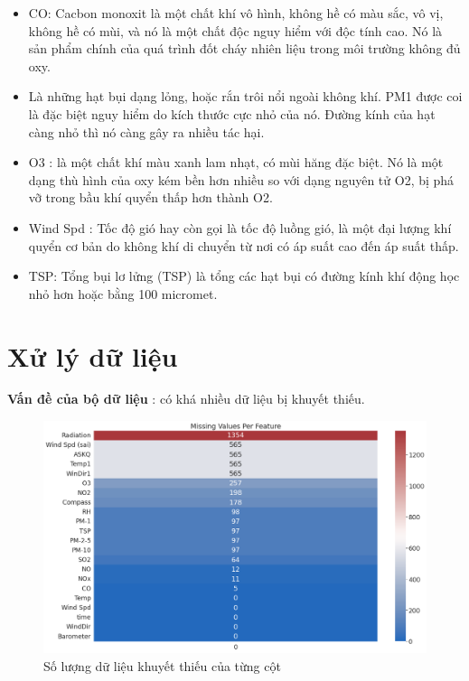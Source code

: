 \begin{itemize}
    \item CO: Cacbon monoxit là một chất khí vô hình, không hề có màu sắc, vô vị, không hề có mùi, và nó là một chất độc nguy hiểm với độc tính cao. Nó là sản phẩm chính của quá trình đốt cháy nhiên liệu trong môi trường không đủ oxy.
    \item Là những hạt bụi dạng lỏng, hoặc rắn trôi nổi ngoài không khí. PM1 được coi là đặc biệt nguy hiểm do kích thước cực nhỏ của nó. Đường kính của hạt càng nhỏ thì nó càng gây ra nhiều tác hại.
    \item O3 : là một chất khí màu xanh lam nhạt, có mùi hăng đặc biệt. Nó là một dạng thù hình của oxy kém bền hơn nhiều so với dạng nguyên tử O2, bị phá vỡ trong bầu khí quyển thấp hơn thành O2.
    \item Wind Spd : Tốc độ gió hay còn gọi là tốc độ luồng gió, là một đại lượng khí quyển cơ bản do không khí di chuyển từ nơi có áp suất cao đến áp suất thấp.
    \item TSP: Tổng bụi lơ lửng (TSP) là tổng các hạt bụi có đường kính khí động học nhỏ hơn hoặc bằng 100 micromet. 
\end{itemize}

\newpage
\section{Xử lý dữ liệu}
\noindent \textbf{Vấn đề của bộ dữ liệu} : có khá nhiều dữ liệu bị khuyết thiếu.
\begin{figure}[H]
    \centering
    \includegraphics[width=.93\textwidth]{figures/missing.png}
    \caption[Số lượng dữ liệu khuyết thiếu của từng cột]{Số lượng dữ  liệu khuyết thiếu của từng cột}
\end{figure}

